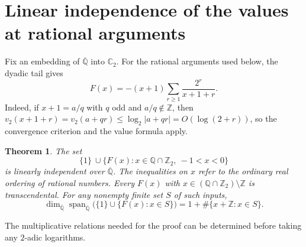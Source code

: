 \documentclass[11pt]{article}
\newtheorem{theorem}{Theorem}[section]
\begin{document}
\section{Linear independence of the values at rational arguments}\label{tr:section}

Fix an embedding of
$\overline{\mathbb Q}$ into $\mathbb C_2$. For the rational arguments
used below, the dyadic tail gives
\begin{equation}\label{tr:tail}
             F(x)=-(x+1)\sum_{r\ge1}\frac{2^r}{x+1+r}.
\end{equation}
Indeed, if $x+1=a/q$ with $q$ odd and $a/q\notin\mathbb Z$, then
$v_2(x+1+r)=v_2(a+qr)\le\log_2|a+qr|=O(\log(2+r))$, so the
convergence criterion and the value formula apply.

\begin{theorem}\label{tr:main}
The set
\[
 \{1\}\ \cup \bigl\{F(x):x\in\mathbb Q\cap\mathbb Z_2,\ -1<x<0\bigr\}
\]
is linearly independent over $\overline{\mathbb Q}$. The inequalities
on $x$ refer to the ordinary real ordering of rational numbers.
Every $F(x)$ with $x\in(\mathbb Q\cap\mathbb Z_2)\setminus\mathbb Z$
is transcendental. For any nonempty finite set $S$ of such inputs,
\[
 \dim_{\overline{\mathbb Q}}
 \operatorname{span}_{\overline{\mathbb Q}}
       \bigl(\{1\}\cup\{F(x):x\in S\}\bigr)
       =1+\#\{x+\mathbb Z:x\in S\}.
\]
\end{theorem}

The multiplicative relations needed for the proof can be determined
before taking any $2$-adic logarithms.
\end{document}
